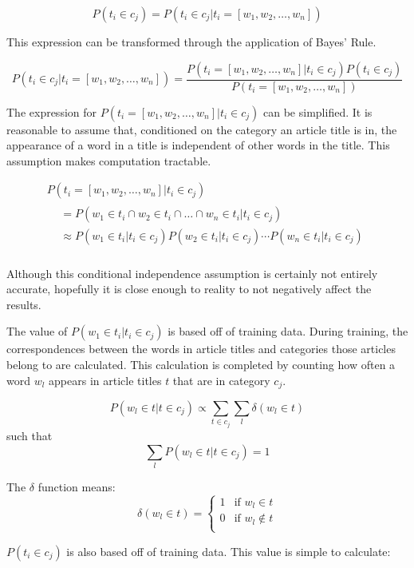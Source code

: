 \documentclass{article}
\begin{document}
\[P(t_i \in c_j) = P(t_i \in c_j | t_i = [w_1, w_2, \dots, w_n])\]

This expression can be transformed through the application of Bayes' Rule.

\[P(t_i \in c_j | t_i = [w_1, w_2, \dots, w_n]) = \frac{P(t_i = [w_1, w_2,
  \dots, w_n] | t_i \in c_j) P(t_i \in c_j)}{P(t_i = [w_1, w_2, \dots, w_n])}\]

The expression for $P(t_i = [w_1, w_2, \dots, w_n] | t_i \in c_j)$ can be
simplified. It is reasonable to assume that, conditioned on the category an
article title is in, the appearance of a word in a title is independent of
other words in the title. This assumption makes computation tractable.

\begin{multline*}
P(t_i = [w_1, w_2, \dots, w_n] | t_i \in c_j) \\
\begin{aligned}
& = P(w_1 \in t_i \cap w_2 \in t_i \cap \dots \cap w_n \in t_i | t_i \in c_j) \\
& \approx P(w_1 \in t_i | t_i \in c_j) P(w_2 \in t_i | t_i \in c_j) \cdots P(w_n
\in t_i | t_i \in c_j) \\
\end{aligned}
\end{multline*}

Although this conditional independence assumption is certainly not entirely
accurate, hopefully it is close enough to reality to not negatively affect the
results.

The value of $P(w_1 \in t_i | t_i \in c_j)$ is based off of training data.
During training, the correspondences between the words in article titles and
categories those articles belong to are calculated. This calculation is
completed by counting how often a word $w_l$ appears in article titles $t$ that
are in category $c_j$. 

\[P(w_l \in t | t \in c_j) \propto \displaystyle \sum_{t \in c_j} \sum_l 
    \delta (w_l \in t)\]
such that
\[\displaystyle \sum_l P(w_l \in t | t \in c_j) = 1\]

The $\delta$ function means:
\[\delta (w_l \in t) = \begin{cases}
  1 & \text{if } w_l \in t \\
  0 & \text{if } w_l \notin t \\
\end{cases} \]

$P(t_i \in c_j)$ is also based off of training data.  This value is simple to
calculate:
\end{document}
